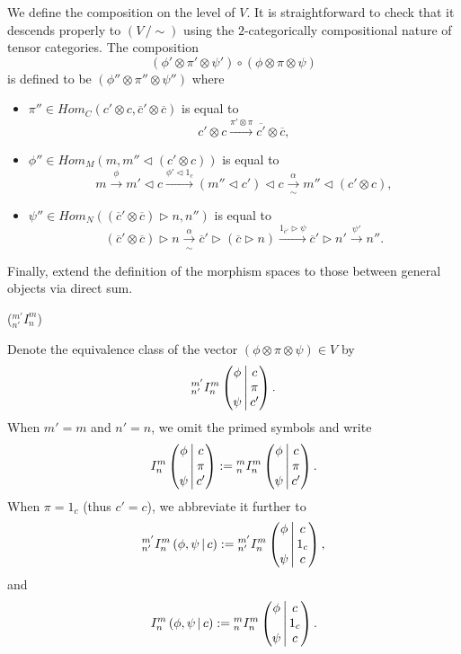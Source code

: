 \begin{definition}
  \noindent We define the composition on the level of $V$. It is
  straightforward to check that it descends properly to $(V \, / \sim)$ using
  the $2$-categorically compositional nature of tensor categories.
  The composition
  \[
    (\phi' \otimes \pi' \otimes \psi' ) \circ (\phi \otimes \pi \otimes \psi)
  \]
  is defined to be $(\phi'' \otimes \pi'' \otimes \psi'')$ where
  \begin{itemize}
    \item
    $\pi'' \in Hom_{C}(c' \otimes c, \overline{c}' \otimes \overline{c})$ is equal to
    \[
      c' \otimes c \xrightarrow{\pi' \otimes \pi} \overline{c'} \otimes \overline{c},
    \]
    \item
    \noindent $\phi'' \in Hom_{M}(m, m'' \lhd (c' \otimes c))$ is equal to
    \[
      m \xrightarrow{\phi} m' \lhd c \xrightarrow{\phi' \lhd 1_{c}} (m'' \lhd c') \lhd c \xrightarrow[\sim]{\alpha} m'' \lhd (c' \otimes c),
    \]
    \item
    \noindent $\psi'' \in Hom_{N}((\overline{c}' \otimes \overline{c}) \rhd n, n'')$ is equal to
    \[
      (\overline{c}' \otimes \overline{c}) \rhd n \xrightarrow[\sim]{\alpha} \overline{c}' \rhd (\overline{c} \rhd n) \xrightarrow{1_{\overline{c}'} \rhd \psi} \overline{c}' \rhd n' \xrightarrow{\psi'} n''.
    \]
  \end{itemize}

  \begin{center}
    
  \end{center}

  \noindent Finally, extend the definition of the morphism spaces to those between
  general objects via direct sum.

\end{definition}

\begin{notation} (${}^{m'}_{n'}I^{m}_{n}$)

  \noindent Denote the equivalence class of the vector
  $(\phi \otimes \pi \otimes \psi) \in V$ by
  \[{}^{m'}_{n'} I^{m}_{n} \left( \begin{matrix} \phi \\ {}\\ \psi \end{matrix} \,\middle|\, \begin{matrix} c \\ \pi \\ c' \end{matrix} \right).\]
  When $m' = m$ and $n' = n$, we omit the primed symbols and write
  \[
    {}^{}_{} I^{m}_{n} \left( \begin{matrix} \phi \\ {}\\ \psi \end{matrix} \,\middle|\, \begin{matrix} c \\ \pi \\ c' \end{matrix} \right) :=
    {}^{m}_{n} I^{m}_{n} \left( \begin{matrix} \phi \\ {}\\ \psi \end{matrix} \,\middle|\, \begin{matrix} c \\ \pi \\ c' \end{matrix} \right).
  \]
  When $\pi = 1_{c}$ (thus $c' = c$), we abbreviate it further to
  \[
    {}^{m'}_{n'} I^{m}_{n} \left( \phi, \psi \,\middle|\, c \right) :=
    {}^{m'}_{n'} I^{m}_{n} \left( \begin{matrix} \phi \\ {}\\ \psi \end{matrix} \,\middle|\, \begin{matrix} c \\ 1_{c} \\ c \end{matrix} \right),
  \]
  and
  \[
    {}^{}_{} I^{m}_{n} \left( \phi, \psi \,\middle|\, c \right) :=
    {}^{m}_{n} I^{m}_{n} \left( \begin{matrix} \phi \\ {}\\ \psi \end{matrix} \,\middle|\, \begin{matrix} c \\ 1_{c} \\ c \end{matrix} \right).
  \]
\end{notation}

